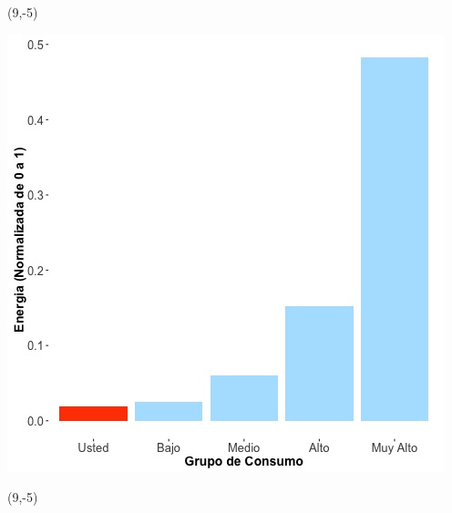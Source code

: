 \documentclass{article}\usepackage[]{graphicx}\usepackage[]{color}
\newenvironment{knitrout}{}{} %
\begin{document}
 \begin{textblock}{1}(9,-5)
\begin{minipage}{20em}
\begingroup

\endgroup
\end{minipage}
\end{textblock}


\begin{knitrout}
\color{fgcolor}
\includegraphics[scale=0.65]{figure/A7_neighbor_plot} 
\end{knitrout}

 \begin{textblock}{1}(9,-5)
\begin{minipage}{20em}
\begingroup

\endgroup
\end{minipage}
\end{textblock}
\end{document}
